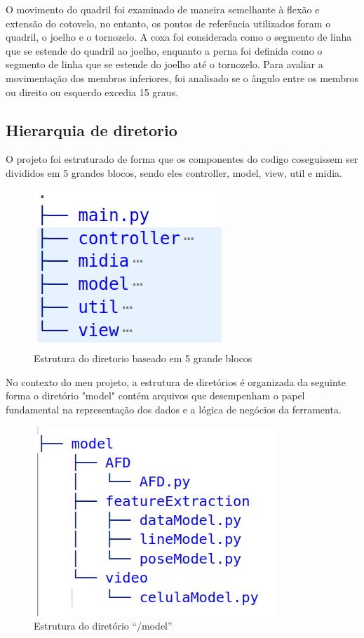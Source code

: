  O movimento do quadril foi examinado de maneira semelhante à flexão e extensão do cotovelo, no entanto, os pontos de referência utilizados foram o quadril, o joelho e o tornozelo. A coxa foi considerada como o segmento de linha que se estende do quadril ao joelho, enquanto a perna foi definida como o segmento de linha que se estende do joelho até o tornozelo. Para avaliar a movimentação dos membros inferiores, foi analisado se o ângulo entre os membros ou direito ou esquerdo excedia 15 graus.






\subsection[Hierarquia de diretorio]{Hierarquia de diretorio}


O projeto foi estruturado de forma que os componentes do codigo coseguissem ser divididos em  5 grandes blocos, sendo eles controller, model, view, util e midia. 

\begin{figure}[!htb]
	\centering
	\includegraphics[scale=0.5]{figuras/diretorios/Blocos.png}
	\caption{Estrutura do diretorio baseado em 5 grande blocos }
	\label{fig:blocos}
\end{figure}

No contexto do meu projeto, a estrutura de diretórios é organizada da seguinte forma o diretório "model" contém arquivos que desempenham o papel fundamental na representação dos dados e a lógica de negócios da ferramenta.

\begin{figure}[!htb]
    \centering
    \includegraphics[scale=0.5]{figuras/diretorios/model.png}
    \caption{Estrutura do diretório ``/model''}
    \label{fig:model}
\end{figure}
\newpage


